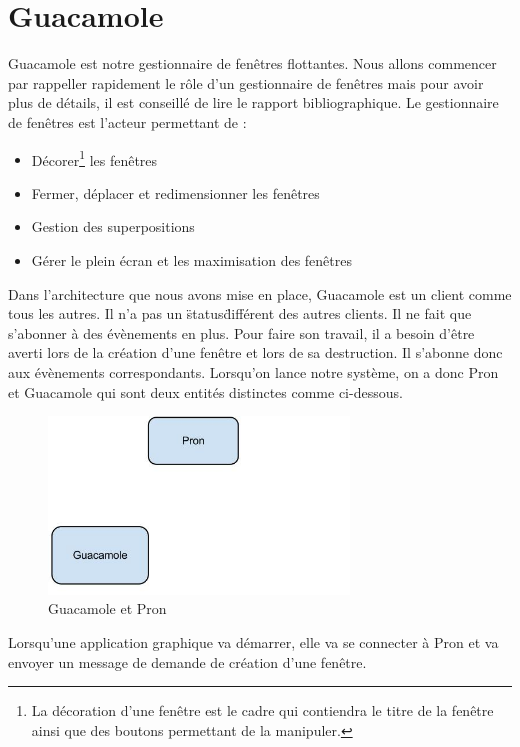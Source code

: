 \section{Guacamole}

Guacamole est notre gestionnaire de fenêtres flottantes.
Nous allons commencer par rappeller rapidement le rôle d'un gestionnaire de fenêtres mais pour avoir plus de détails, il est conseillé de lire le rapport bibliographique.
Le gestionnaire de fenêtres est l'acteur permettant de :

\begin{itemize}
  \item Décorer\footnote{La décoration d'une fenêtre est le cadre qui contiendra le titre de la fenêtre ainsi que des boutons permettant de la manipuler.} les fenêtres
  \item Fermer, déplacer et redimensionner les fenêtres
  \item Gestion des superpositions
  \item Gérer le plein écran et les maximisation des fenêtres
\end{itemize}

Dans l'architecture que nous avons mise en place, Guacamole est un client comme tous les autres. Il n'a pas un \"status\" différent des autres clients. Il ne fait que s'abonner à des évènements en plus. Pour faire son travail, il a besoin d'être averti lors de la création d'une fenêtre et lors de sa destruction. Il s'abonne donc aux évènements correspondants. Lorsqu'on lance notre système, on a donc Pron et Guacamole qui sont deux entités distinctes comme ci-dessous.

\begin{figure}[H]
  \centering
  \includegraphics[width=8cm]{images/Guacamole_anim_1.jpg}
  \caption{Guacamole et Pron}
  \label{fig:guacamole_anim_1}
\end{figure}

Lorsqu'une application graphique va démarrer, elle va se connecter à Pron et va envoyer un message de demande de création d'une fenêtre.

